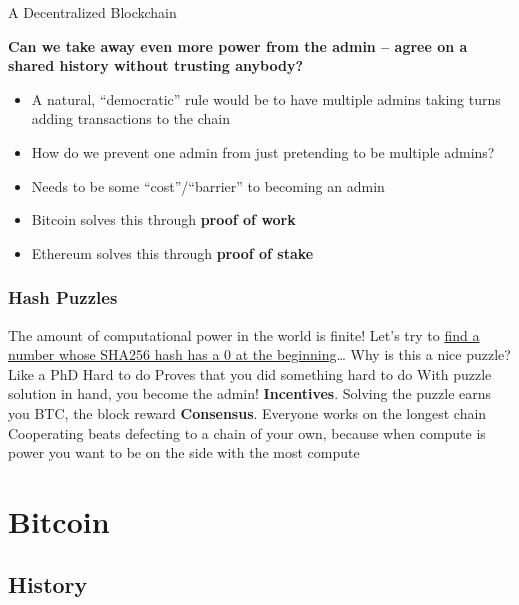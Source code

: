 \documentclass[aspectratio=169]{beamer}
\begin{document}
\begin{frame}{A Decentralized Blockchain}

\textbf{Can we take away even more power from the admin -- agree on a shared history without trusting anybody?} \pause

\begin{itemize}
    \item  A natural, “democratic” rule would be to have multiple admins taking turns adding transactions to the chain \pause 
    \item How do we prevent one admin from just pretending to be multiple admins?  
    \item Needs to be some “cost”/“barrier” to becoming an admin  
    \item Bitcoin solves this through \textbf{proof of work}
    \item Ethereum solves this through \textbf{proof of stake}
\end{itemize}
    
\end{frame}


\begin{frame}
\frametitle{Hash Puzzles}

\bi
\m The amount of computational power in the world is finite!
\m Let's try to \href{https://emn178.github.io/online-tools/sha256.html}{find a number whose SHA256 hash has a 0 at the beginning}\ldots \pause 
\m Why is this a nice puzzle? Like a PhD
\be
\m Hard to do
\m Proves that you did something hard to do \pause 
\ee
\m With puzzle solution in hand, you become the admin!
\m \textbf{Incentives}. Solving the puzzle earns you BTC, the block reward
\m \textbf{Consensus}. Everyone works on the longest chain 
\bi
\m Cooperating beats defecting to a chain of your own, because when compute is power you want to be on the side with the most compute
\ei 
\ei

\end{frame}






\section{Bitcoin}

\subsection{History}
\end{document}
